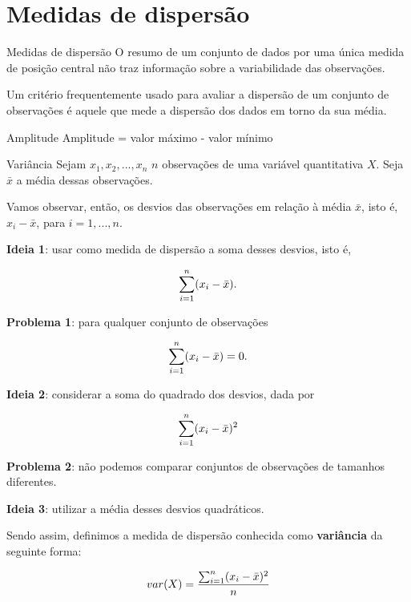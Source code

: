 \documentclass[
  9pt,
  ignorenonframetext,
  aspectratio=169]{beamer}
\begin{document}
\hypertarget{medidas-de-dispersuxe3o}{%
\section{Medidas de dispersão}\label{medidas-de-dispersuxe3o}}

\begin{frame}{Medidas de dispersão}
O resumo de um conjunto de dados por uma única medida de posição central
não traz informação sobre a variabilidade das observações.

Um critério frequentemente usado para avaliar a dispersão de um conjunto
de observações é aquele que mede a dispersão dos dados em torno da sua
média.
\end{frame}

\begin{frame}{Amplitude}
\protect\hypertarget{amplitude}{}
Amplitude = valor máximo - valor mínimo
\end{frame}

\begin{frame}{Variância}
\protect\hypertarget{variuxe2ncia}{}
Sejam \(x_1, x_2, ..., x_n\) \(n\) observações de uma variável
quantitativa \(X\). Seja \(\bar{x}\) a média dessas observações.

Vamos observar, então, os desvios das observações em relação à média
\(\bar{x}\), isto é, \(x_i - \bar{x}\), para \(i = 1, ..., n\).

\textbf{Ideia 1}: usar como medida de dispersão a soma desses desvios,
isto é,

\[ \Large
\sum_{i=1}^{n}(x_i - \bar{x}).
\]
\end{frame}

\begin{frame}{}
\protect\hypertarget{section}{}
\textbf{Problema 1}: para qualquer conjunto de observações

\[ \Large
\sum_{i=1}^{n}(x_i - \bar{x}) = 0.
\]

\textbf{Ideia 2}: considerar a soma do quadrado dos desvios, dada por

\[ \Large
\sum_{i=1}^{n}(x_i - \bar{x})^2
\]
\end{frame}

\begin{frame}{}
\protect\hypertarget{section-1}{}
\textbf{Problema 2}: não podemos comparar conjuntos de observações de
tamanhos diferentes.

\textbf{Ideia 3}: utilizar a média desses desvios quadráticos.

Sendo assim, definimos a medida de dispersão conhecida como
\textbf{variância} da seguinte forma:

\[ \Large
var(X) = \frac{\sum_{i=1}^{n}(x_i - \bar{x})^2}{n}
\]
\end{frame}
\end{document}
